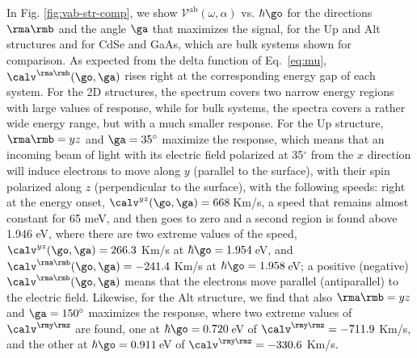 \documentclass[floatfix,prb,aps,superscriptaddress,showpacs,11pt,preprint,letterpaper]{revtex4}
\begin{document}
In Fig. \ref{fig:vab-str-comp}, we show $\mathcal{V}^{\mathrm{ab}}
(\omega,\alpha)$ vs. $\hbar\go$ for the directions $\rma\rmb$ and the angle $\ga$
that maximizes the signal, for the Up  and Alt structures and for CdSe and
GaAs, which are bulk systems shown for comparison.
% 
As expected from the delta function of Eq.~\eqref{eq:mu},
$\calv^{\rma\rmb}(\go,\ga)$ rises right at the corresponding energy gap of each
system. For the 2D structures, the spectrum covers two narrow energy regions
with large values of response, while for bulk systems, the spectra covers a
rather wide energy range, but with a much smaller response.
% 
For the Up structure, $\rma\rmb=yz$ and $\ga=35^\circ$ maximize the response,
which means that an incoming beam of light with its electric field polarized at
35$^\circ$ from the $x$ direction will induce electrons to move along $y$
(parallel to the surface), with their spin polarized along $z$ (perpendicular to
the surface), with the following speeds:
% 
right at the energy onset, $\calv^{yz}(\go,\ga)=668$\,Km/s, a speed that remains
almost constant for 65 meV, and then goes to zero and a second region is found
above 1.946 eV, where there are two extreme values of the speed,
$\calv^{yz}(\go,\ga)=266.3$ Km/s at $\hbar\go=1.954$\,eV, and
$\calv^{\rma\rmb}(\go,\ga)=-241.4$ Km/s at $\hbar\go=1.958$\,eV; a positive
(negative) $\calv^{\rma\rmb}(\go,\ga)$ means that the electrons move parallel
(antiparallel) to the electric field.
Likewise, for the Alt structure, we find that also $\rma\rmb=yz$ and
$\ga=150^\circ$ maximizes the response, where two extreme values of
$\calv^{\rmy\rmz}$ are found, one at  $\hbar\go=0.720$\,eV of
$\calv^{\rmy\rmz}=-711.9$ Km/s, and the other at $\hbar\go=0.911$\,eV of
$\calv^{\rmy\rmz}=-330.6$ Km/s.
 
\end{document}
